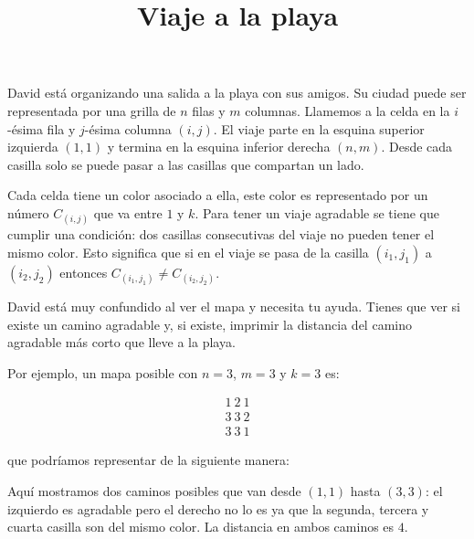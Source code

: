 \documentclass{oci}
\title{Viaje a la playa}
\begin{document}
\begin{problemDescription}
David está organizando una salida a la playa con sus amigos. Su ciudad puede ser representada por una grilla de $n$ filas y $m$ columnas. Llamemos a la celda en la $i$-ésima fila y $j$-ésima columna $(i,j)$. El viaje parte en la esquina superior izquierda $(1,1)$ y termina en la esquina inferior derecha $(n,m)$. Desde cada casilla solo se puede pasar a las casillas que compartan un lado.

Cada celda tiene un color asociado a ella, este color es representado por un número $C_{(i,j)}$ que va entre $1$ y $k$. Para tener un viaje agradable se tiene que cumplir una condición: dos casillas consecutivas del viaje no pueden tener el mismo color. Esto significa que si en el viaje se pasa de la casilla $(i_1,j_1)$ a $(i_2,j_2)$ entonces $C_{(i_1,j_1)} \neq C_{(i_2,j_2)}$.

David está muy confundido al ver el mapa y necesita tu ayuda. Tienes que ver si existe un camino agradable y, si existe, imprimir la distancia del camino agradable más corto que lleve a la playa.

Por ejemplo, un mapa posible con $n = 3$, $m = 3$ y $k = 3$ es:

\begin{gather*}
1\ 2\ 1\\
3\ 3\ 2\\
3\ 3\ 1
\end{gather*}

que podríamos representar de la siguiente manera:

\begin{figure}[!h]
\centering
{}
\end{figure}

Aquí mostramos dos caminos posibles que van desde $(1,1)$ hasta $(3,3)$: el izquierdo es agradable pero el derecho no lo es ya que la segunda, tercera y cuarta casilla son del mismo color. La distancia en ambos caminos es $4$.

\end{problemDescription}
\end{document}
